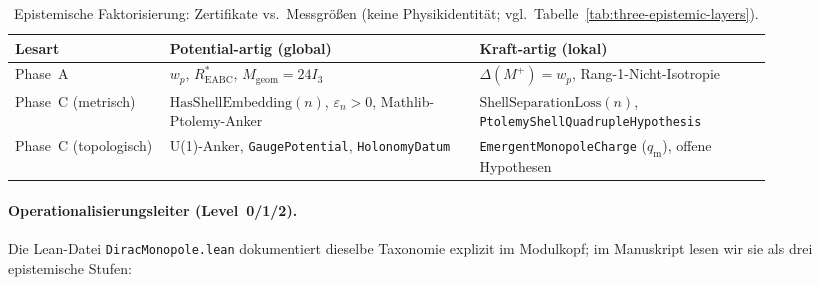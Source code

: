 \documentclass[11pt,a4paper]{article}
\begin{document}
	\begin{table}[h!]
		\centering
		\small
		\begin{tabular}{@{}p{0.18\linewidth}p{0.36\linewidth}p{0.34\linewidth}@{}}
			\hline
			\textbf{Lesart} & \textbf{Potential-artig (global)} & \textbf{Kraft-artig (lokal)} \\
			\hline
			Phase~A &
			$w_p$, $R^*_{\mathrm{EABC}}$, $M_{\mathrm{geom}}=24I_3$ &
			$\Delta(M^+)=w_p$, Rang-1-Nicht-Isotropie \\
			Phase~C (metrisch) &
			$\mathrm{HasShellEmbedding}(n)$, $\varepsilon_n>0$,
			Mathlib-Ptolemy-Anker &
			$\mathrm{ShellSeparationLoss}(n)$,
			\texttt{PtolemyShellQuadrupleHypothesis} \\
			Phase~C (topologisch) &
			U(1)-Anker, \texttt{GaugePotential}, \texttt{HolonomyDatum} &
			\texttt{EmergentMonopoleCharge} ($q_{\mathrm m}$), offene Hypothesen \\
			\hline
		\end{tabular}
		\caption{Epistemische Faktorisierung: Zertifikate vs.\ Messgrößen
			(keine Physikidentität; vgl.\ Tabelle~\ref{tab:three-epistemic-layers}).}
		\label{tab:potential-force}
	\end{table}
	
	\paragraph{Operationalisierungsleiter (Level~0/1/2).}
	Die Lean-Datei \texttt{DiracMonopole.lean} dokumentiert dieselbe Taxonomie
	explizit im Modulkopf; im Manuskript lesen wir sie als drei epistemische Stufen:
	
\end{document}
